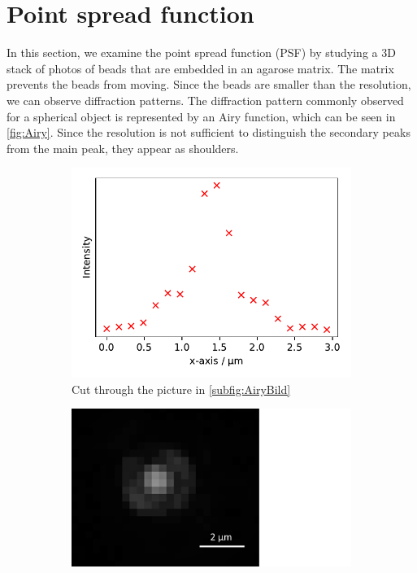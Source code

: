 \section{Point spread function}
\label{sec:PSF}

In this section, we examine the point spread function (PSF) by studying a 3D stack of photos of beads that are
embedded in an agarose matrix. The matrix prevents the beads from moving. Since the beads are smaller
than the resolution, we can observe diffraction patterns. The diffraction pattern commonly observed for a spherical object is represented by an Airy function, which can be seen in \cref{fig:Airy}. 
Since the resolution is not sufficient to distinguish the secondary peaks from the main peak, they appear as shoulders.
\begin{figure}[h]
    \centering
    \begin{subfigure}{0.51\linewidth}
        \centering
        \includegraphics[width = \textwidth]{Bilder/PSF/Airy.pdf}
        \caption{Cut through the picture in \ref*{subfig:AiryBild}}
        \label{subfig:Airy}
    \end{subfigure}
    \hfill
    \begin{subfigure}{0.43\linewidth}
        \centering
        \includegraphics[width = \textwidth]{Bilder/PSF/2DBeugung_cropped.pdf}

\end{subfigure}
\end{figure}
